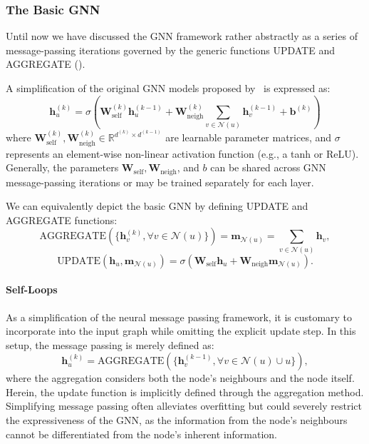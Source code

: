 \subsubsection{The Basic GNN}
Until now we have discussed the GNN framework rather abstractly as a series of message-passing iterations governed by the generic functions UPDATE and AGGREGATE (). 

A simplification of the original GNN models proposed by~\cite{Merkwirth2005automaticGenerationComplementaryDescriptorsMolecularGraphNetworks}\cite{scarselli2008graphNeuralNetworkModel} is expressed as:
\begin{equation}\label{eq:basicGNNAGGUP}
    \mathbf{h}_u^{(k)} = \sigma\left(\mathbf{W}_\text{self}^{(k)}\mathbf{h}_u^{(k-1)} + \mathbf{W}_\text{neigh}^{(k)}\sum_{v\in\mathcal{N}(u)}\mathbf{h}_v^{(k-1)} + \mathbf{b}^{(k)}\right)
\end{equation}
where $ \mathbf{W}_\text{self}^{(k)}, \mathbf{W}_\text{neigh}^{(k)} \in \mathbb{R}^{d^{(k)}\times d^{(k-1)}} $ are learnable parameter matrices, and $ \sigma $ represents an element-wise non-linear activation function (e.g., a tanh or ReLU). Generally, the parameters $ \mathbf{W}_\text{self}, \mathbf{W}_\text{neigh} $, and $ b $ can be shared across GNN message-passing iterations or may be trained separately for each layer.

We can equivalently depict the basic GNN by defining UPDATE and AGGREGATE functions:
\begin{equation*}
    \text{AGGREGATE}(\{\mathbf{h}_v^{(k)}, \forall v \in \mathcal{N}(u)\}) =
    \mathbf{m}_{\mathcal{N}(u)} = \sum_{v\in\mathcal{N}(u)}\mathbf{h}_v,
\end{equation*}
\begin{equation}\label{eq:updateBase}
    \text{UPDATE}(\mathbf{h}_u, \mathbf{m}_{\mathcal{N}(u)}) = \sigma(\mathbf{W}_\text{self}\mathbf{h}_u + \mathbf{W}_\text{neigh}\mathbf{m}_{\mathcal{N}(u)}).
\end{equation}

\paragraph{Self-Loops}
As a simplification of the neural message passing framework, it is customary to incorporate  into the input graph while omitting the explicit update step. In this setup, the message passing is merely defined as:
\begin{equation}\label{eq:selfLoop}
    \mathbf{h}_u^{(k)} = \text{AGGREGATE}(\{\mathbf{h}_v^{(k-1)}, \forall v \in \mathcal{N}(u)\cup {u}\}),
\end{equation}
where the aggregation considers both the node's neighbours and the node itself. Herein, the update function is implicitly defined through the aggregation method. Simplifying message passing often alleviates overfitting but could severely restrict the expressiveness of the GNN, as the information from the node's neighbours cannot be differentiated from the node's inherent information.


